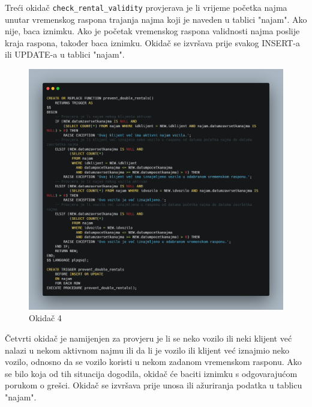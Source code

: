 \documentclass[]{foi}
\begin{document}
Treći okidač \texttt{check\_rental\_validity} provjerava je li vrijeme početka najma unutar vremenskog raspona trajanja najma koji je naveden u tablici "najam". Ako nije, baca iznimku. Ako je početak vremenskog raspona validnosti najma poslije kraja raspona, također baca iznimku. Okidač se izvršava prije svakog INSERT-a ili UPDATE-a u tablici "najam".
\newpage

\begin{figure}[!ht]
    \centering
    \includegraphics[width=1\textwidth]{slike/4.png}
    \caption{Okidač 4}
    \label{fig:cetvrti}
\end{figure}

Četvrti okidač je namijenjen za provjeru je li se neko vozilo ili neki klijent već nalazi u nekom aktivnom najmu ili da li je vozilo ili klijent već iznajmio neko vozilo, odnosno da se vozilo koristi u nekom zadanom vremenskom rasponu. Ako se bilo koja od tih situacija dogodila, okidač će baciti iznimku s odgovarajućom porukom o grešci. Okidač se izvršava prije unosa ili ažuriranja podatka u tablicu "najam".
\newpage
\end{document}
